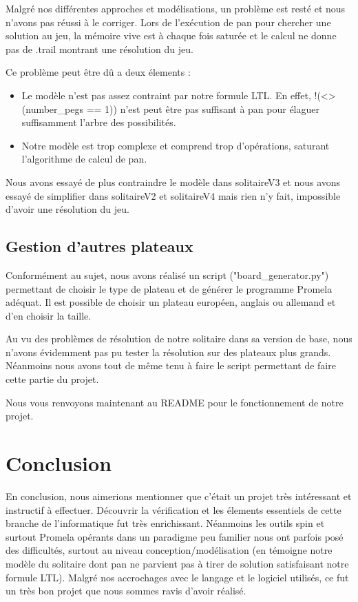 \documentclass[12pt, a4paper]{report}
\begin{document}
Malgré nos différentes approches et modélisations, un problème est resté et nous n'avons pas réussi à le corriger. Lors de l'exécution de pan pour chercher une solution au jeu, la mémoire vive est à chaque fois saturée et le calcul ne donne pas de .trail montrant une résolution du jeu.

Ce problème peut être dû a deux élements :
\begin{itemize}
\item Le modèle n'est pas assez contraint par notre formule LTL. En effet, !(<>(number_pegs == 1)) n'est peut être pas suffisant à pan pour élaguer suffisamment l'arbre des possibilités.
\item Notre modèle est trop complexe et comprend trop d'opérations, saturant l'algorithme de calcul de pan.
\end{itemize}
Nous avons essayé de plus contraindre le modèle dans solitaireV3 et nous avons essayé de simplifier dans solitaireV2 et solitaireV4 mais rien n'y fait, impossible d'avoir une résolution du jeu.

\subsection{Gestion d'autres plateaux}

Conformément au sujet, nous avons réalisé un script ("board_generator.py") permettant de choisir le type de plateau et de générer le programme Promela adéquat. Il est possible de choisir un plateau européen, anglais ou allemand et d'en choisir la taille.

Au vu des problèmes de résolution de notre solitaire dans sa version de base, nous n'avons évidemment pas pu tester la résolution sur des plateaux plus grands. Néanmoins nous avons tout de même tenu à faire le script permettant de faire cette partie du projet.

Nous vous renvoyons maintenant au README pour le fonctionnement de notre projet.

\section{Conclusion}

En conclusion, nous aimerions mentionner que c'était un projet très intéressant et instructif à effectuer. Découvrir la vérification et les élements essentiels de cette branche de l'informatique fut très enrichissant. Néanmoins les outils spin et surtout Promela opérants dans un paradigme peu familier nous ont parfois posé des difficultés, surtout au niveau conception/modélisation (en témoigne notre modèle du solitaire dont pan ne parvient pas à tirer de solution satisfaisant notre formule LTL). Malgré nos accrochages avec le langage et le logiciel utilisés, ce fut un très bon projet que nous sommes ravis d'avoir réalisé.
\end{document}
